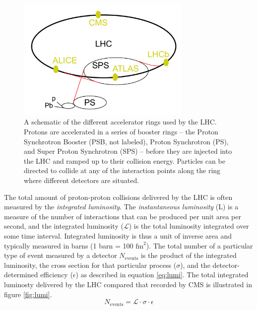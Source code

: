 \begin{figure}
	\centering
	\includegraphics[width=0.75\textwidth]{detector/figs/LHC}
	\renewcommand{\baselinestretch}{1.0}
	\caption[A schematic of the different accelerator rings used by the LHC.]{A schematic of the different accelerator rings used by the LHC. Protons are accelerated in a series of booster rings -- the Proton Synchrotron Booster (PSB, not labeled), Proton Synchrotron (PS), and Super Proton Synchrotron (SPS) -- before they are injected into the LHC and ramped up to their collision energy. Particles can be directed to collide at any of the interaction points along the ring where different detectors are situated. \cite{cc}}
	\label{fig:lhcSchematic}
\end{figure}

The total amount of proton-proton collisions delivered by the LHC is often measured by the {\it integrated luminosity}. The {\it instantaneous luminosity} (L) is a measure of the number of interactions that can be produced per unit area per second, and the integrated luminosity ($\mathcal{L}$) is the total luminosity integrated over some time interval. Integrated luminosity is thus a unit of inverse area and typically measured in barns (1 barn = 100 $\text{fm}^2$). The total number of a particular type of event measured by a detector $N_{\mathrm{events}}$ is the product of the integrated luminosity, the cross section for that particular process ($\sigma$), and the detector-determined efficiency ($\epsilon$) as described in equation \ref{eq:lumi}. The total integrated luminosty delivered by the LHC compared that recorded by CMS is illustrated in figure \ref{fig:lumi}.
\begin{equation}
	N_{\mathrm{events}} = \mathcal{L} \cdot \sigma \cdot \epsilon
	\label{eq:lumi}
\end{equation}

